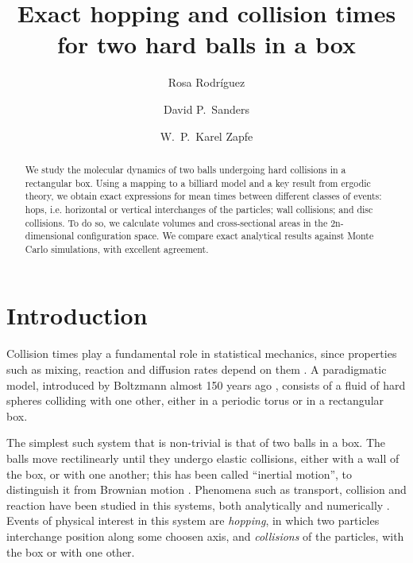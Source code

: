 \documentclass[superscriptaddress,pre,reprint,showpacs,twocolumn]{revtex4-1}
\begin{document}
\title{Exact hopping and collision times for two hard balls in a box}

\author{Rosa Rodríguez}

\author{David P.~Sanders}

\author{W.~P.~Karel Zapfe}



\begin{abstract}
We study the molecular dynamics of two balls undergoing hard collisions in a rectangular box.
Using a mapping to a billiard model and a key result from ergodic theory, we obtain exact expressions for mean times between different classes of events:
hops, i.e. horizontal or vertical interchanges of the particles; wall collisions; and disc collisions.
To do so, we calculate
volumes and cross-sectional areas in the 2n-dimensional configuration space.
We compare exact analytical results against Monte Carlo simulations, with excellent agreement.
\end{abstract}

\maketitle



\section{Introduction}


Collision times play a fundamental role in statistical mechanics, since properties
such as mixing, reaction and diffusion rates depend on them \cite{Boltz72, Tolman, VanKampen}.
A paradigmatic model, introduced by Boltzmann almost 150 years ago \cite{Boltz72, SzaszBook00},
consists of a fluid of hard spheres colliding with one other, either in a periodic torus or in
a rectangular box.

The simplest such system that is non-trivial is that of two balls in a box.
The balls move rectilinearly until they undergo
elastic collisions, either with a wall of the box, or with one another; this has been called ``inertial motion'', to distinguish it from Brownian motion \cite{Bowles04}.
Phenomena such as transport, collision and reaction
have been studied in this systems, both analytically 
 \cite{Awazu01, Munakata02, Suh05} and numerically \cite{MacElroy2004, MacElroy2005}.
 Events of physical interest in this system are \emph{hopping},
in which two particles interchange position along some choosen axis,
and \emph{collisions} of the particles, with the box or with one other.
\end{document}

